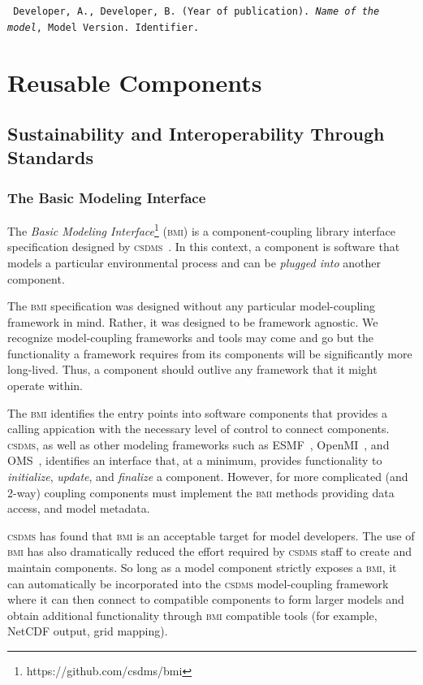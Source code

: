 \documentclass[11pt, oneside]{amsart}
\DeclareRobustCommand{\csdms}{\textsc{csdms}}
\DeclareRobustCommand{\bmi}{\textsc{bmi}}
\begin{document}
\begin{shaded}
\leftskip 0.25in
\parindent -0.25in
\tt{
Developer, A., Developer, B. (Year of publication). \emph{Name of the model},
Model Version. Identifier.
}
\end{shaded}

\section{Reusable Components}
\label{sec:reusable}

\subsection{Sustainability and Interoperability Through Standards}
\label{sec:standards}

\subsubsection{The Basic Modeling Interface}
\label{sec:bmi}

The \emph{Basic Modeling Interface}\footnote{https://github.com/csdms/bmi}
(\bmi{}) is a component-coupling library
interface specification designed by \csdms~\cite{peckham2012component,
syvitski2014plug}.  In this context, a component is software that models a
particular environmental process and can be \emph{plugged into} another
component.

The \bmi{} specification was designed without any particular model-coupling
framework in mind.  Rather, it was designed to be framework agnostic. We
recognize model-coupling frameworks and tools may come and go but the
functionality a framework requires from its components will be significantly
more long-lived. Thus, a component should outlive any framework that it might
operate within.

The \bmi{} identifies the entry points into software components that provides a
calling appication with the necessary level of control to connect components.
\csdms, as well as other modeling frameworks such as
ESMF~\cite{hill2004architecture}, OpenMI~\cite{gregersen2007openmi}, and
OMS~\cite{david2002object}, identifies an interface that, at a minimum,
provides functionality to \emph{initialize}, \emph{update}, and
\emph{finalize} a component. However, for more complicated (and 2-way)
coupling components must implement the \bmi{} methods providing data access,
and model metadata.

\csdms{} has found that \bmi{} is an acceptable target for model developers.
The use of \bmi{} has also dramatically reduced the effort required by
\csdms{} staff to create and maintain components. So long as a model component
strictly exposes a \bmi{}, it can automatically be incorporated into the
\csdms{} model-coupling framework where it can then connect to compatible
components to form larger models and obtain additional functionality through
\bmi{} compatible tools (for example, NetCDF output, grid mapping).
\end{document}
